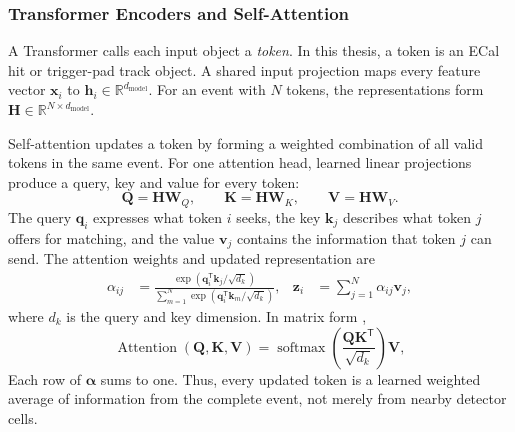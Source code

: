 \subsubsection{Transformer Encoders and Self-Attention}
\label{sec:transformer_encoder_background}

A Transformer calls each input object a \emph{token}. In this thesis, a token
is an ECal hit or trigger-pad track object. A shared input projection maps every
feature vector \(\mathbf{x}_i\) to
\(\mathbf{h}_i\in\mathbb{R}^{d_{\mathrm{model}}}\). For an event with \(N\)
tokens, the representations form
\(\mathbf{H}\in\mathbb{R}^{N\times d_{\mathrm{model}}}\).

Self-attention updates a token by forming a weighted combination of all valid
tokens in the same event. For one attention head, learned linear projections
produce a query, key and value for every token:
\begin{equation}
    \mathbf{Q}=\mathbf{H}\mathbf{W}_Q,
    \qquad
    \mathbf{K}=\mathbf{H}\mathbf{W}_K,
    \qquad
    \mathbf{V}=\mathbf{H}\mathbf{W}_V.
    \label{eq:transformer_qkv}
\end{equation}
The query \(\mathbf{q}_i\) expresses what token \(i\) seeks, the key
\(\mathbf{k}_j\) describes what token \(j\) offers for matching, and the value
\(\mathbf{v}_j\) contains the information that token \(j\) can send. The
attention weights and updated representation are
\begin{align}
    \alpha_{ij}
    &=
    \frac{
        \exp(\mathbf{q}_i^{\mathsf T}\mathbf{k}_j/\sqrt{d_k})
    }{
        \sum_{m=1}^{N}
        \exp(\mathbf{q}_i^{\mathsf T}\mathbf{k}_m/\sqrt{d_k})
    },
    &
    \mathbf{z}_i
    &=
    \sum_{j=1}^{N}\alpha_{ij}\mathbf{v}_j ,
    \label{eq:token_attention}
\end{align}
where \(d_k\) is the query and key dimension. In matrix form
\cite{vaswani2017attention},
\begin{equation}
    \operatorname{Attention}(\mathbf{Q},\mathbf{K},\mathbf{V})
    =
    \operatorname{softmax}
    \!\left(
        \frac{\mathbf{Q}\mathbf{K}^{\mathsf{T}}}{\sqrt{d_k}}
    \right)
    \mathbf{V},
    \label{eq:scaled_dot_product_attention}
\end{equation}
Each row of \(\boldsymbol{\alpha}\) sums to one.
Thus, every updated token is a learned weighted average of information from
the complete event, not merely from nearby detector cells.

